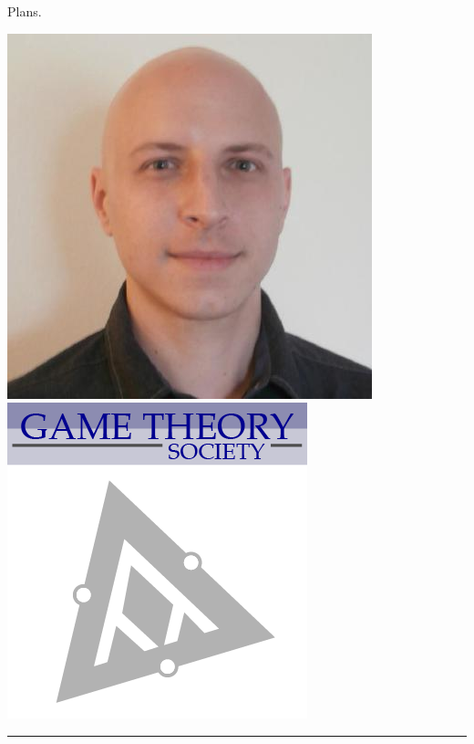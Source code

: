\documentclass{beamer}
\begin{document}
\begin{frame}{Plans.}
\begin{center}
        \includegraphics[height=0.2\textheight]{static/marc.jpeg}
        \hspace{3cm}
        \includegraphics[height=0.2\textheight]{static/game-society.png}

        \rule{\textwidth}{2pt}
        \vspace{5pt}


\end{center}
\end{frame}
\end{document}
